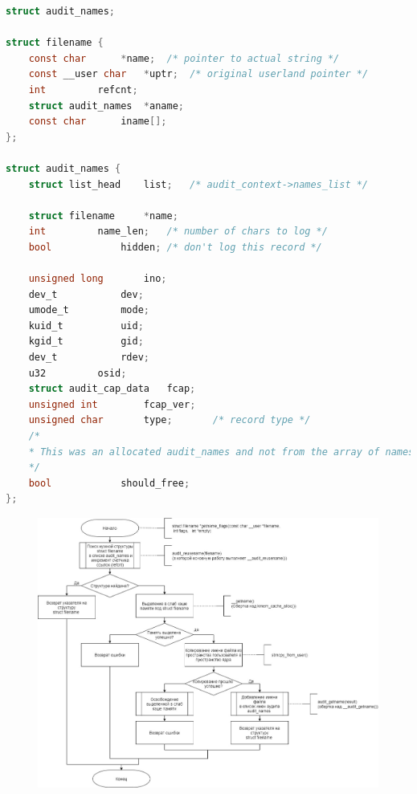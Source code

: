 \documentclass[a4paper,14pt]{extreport}
\begin{document}
\begin{lstlisting}[language=c, caption=Структуры audit\_names и filename]
struct audit_names;

struct filename {
	const char		*name;	/* pointer to actual string */
	const __user char	*uptr;	/* original userland pointer */
	int			refcnt;
	struct audit_names	*aname;
	const char		iname[];
};

struct audit_names {
	struct list_head	list;	/* audit_context->names_list */
	
	struct filename		*name;
	int			name_len;	/* number of chars to log */
	bool			hidden;	/* don't log this record */
	
	unsigned long		ino;
	dev_t			dev;
	umode_t			mode;
	kuid_t			uid;
	kgid_t			gid;
	dev_t			rdev;
	u32			osid;
	struct audit_cap_data	fcap;
	unsigned int		fcap_ver;
	unsigned char		type;		/* record type */
	/*
	* This was an allocated audit_names and not from the array of names allocated in the task audit context.  * Thus this name should be freed on syscall exit.
	*/
	bool			should_free;
};

\end{lstlisting}






\begin{figure}[H]
	\centering
	\includegraphics[scale=0.42]{img/getname_flags.jpg}
\end{figure}
\end{document}
